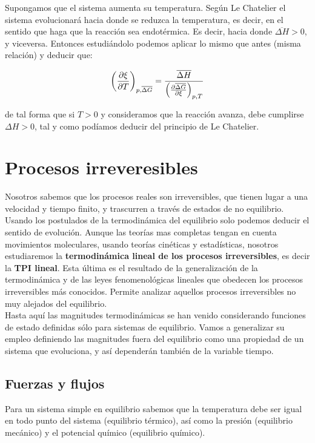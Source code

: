 \documentclass[12pt,a4paper,oneside]{book}
\begin{document}
Supongamos que el sistema aumenta su temperatura. Según Le Chatelier el sistema evolucionará hacia donde se reduzca la temperatura, es decir, en el sentido que haga que la reacción sea endotérmica. Es decir, hacia donde $\overline{\Delta H}>0$, y viceversa. Entonces estudiándolo podemos aplicar lo mismo que antes (misma relación) y deducir que:

\begin{equation}
\left( \frac{\partial \xi}{\partial T} \right)_{p,\overline{\Delta G}} =  \dfrac{\overline{\Delta H}}{\left( \frac{\partial \overline{\Delta G}}{\partial \xi} \right)_{p,T}}
\end{equation}

de tal forma que si $T>0$ y consideramos que la reacción avanza, debe cumplirse  $\Delta H >0$, tal y como podíamos deducir del principio de Le Chatelier.


\chapter{Procesos irreveresibles}

Nosotros sabemos que los procesos reales son irreversibles, que tienen lugar a una velocidad y tiempo finito, y trascurren a través de estados de no equilibrio. Usando los postulados de la termodinámica del equilibrio solo podemos deducir el sentido de evolución. Aunque las teorías mas completas tengan en cuenta movimientos moleculares, usando teorías cinéticas y estadísticas, nosotros estudiaremos la  \textbf{termodinámica lineal de los procesos irreversibles}, es decir la \textbf{TPI lineal}. Esta última es el resultado de la generalización de la termodinámica y de las leyes fenomenológicas lineales que obedecen los procesos irreversibles más conocidos. Permite analizar aquellos procesos irreversibles no muy alejados del equilibrio. \\
 
 Hasta aquí las magnitudes termodinámicas se han venido considerando funciones de estado definidas sólo para sistemas de equilibrio. Vamos a generalizar su empleo definiendo las magnitudes fuera del equilibrio como una propiedad de un sistema que evoluciona, y así dependerán también de la variable tiempo.
 
\section{Fuerzas y flujos}

Para un sistema simple en equilibrio sabemos que la temperatura debe ser igual en todo punto del sistema (equilibrio térmico), así como la presión (equilibrio mecánico) y el potencial químico (equilibrio químico). \\
\end{document}
